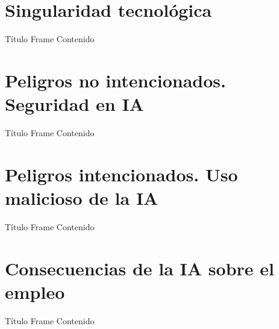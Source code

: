 \documentclass{beamer}
\begin{document}
\section{Singularidad tecnológica}
\begin{frame}{Título Frame}
Contenido
\end{frame}

\section{Peligros no intencionados. Seguridad en IA}
\begin{frame}{Título Frame}
Contenido
\end{frame}

\section{Peligros intencionados. Uso malicioso de la IA}
\begin{frame}{Título Frame}
Contenido
\end{frame}

\section{Consecuencias de la IA sobre el empleo}
\begin{frame}{Título Frame}
Contenido
\end{frame}
\end{document}
